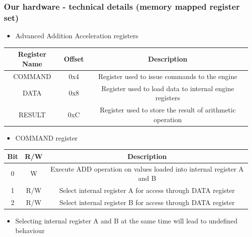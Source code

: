 \documentclass[dvipsnames,table]{beamer}
\begin{document}
\begin{frame}
\label{faaop}
\frametitle{Our hardware - technical details (memory mapped register set)}
\scriptsize
\begin{itemize}
	\item Advanced Addition Acceleration registers
\end{itemize}
\begin{center}
\begin{tabular}{|c|c|c|}
\hline
Register Name & Offset & Description \\
\hline
\hline
COMMAND & 0x4 & Register used to issue commands to the engine \\
\hline
DATA & 0x8 & Register used to load data to internal engine registers \\
\hline
RESULT & 0xC & Register used to store the result of arithmetic operation \\
\hline
\end{tabular}
\end{center}
\begin{itemize}
	\item COMMAND register 
\end{itemize}
\begin{center}
\begin{tabular}{|c|c|c|}
\hline
Bit & R/W & Description \\
\hline
\hline
0 & W & Execute ADD operation on values loaded into internal register A and B \\
\hline
1 & R/W & Select internal register A for access through DATA register  \\
\hline
2 & R/W & Select internal register B for access through DATA register \\
\hline
\end{tabular}
\end{center}
\begin{itemize}
	\item Selecting internal register A and B at the same time will lead to undefined behaviour
\end{itemize}
\end{frame}
\end{document}

